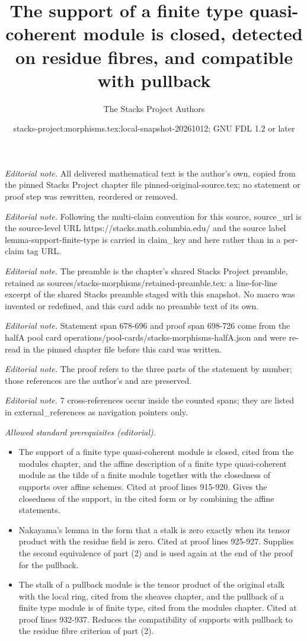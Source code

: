 \documentclass[10pt,a4paper]{amsart}
\title{The support of a finite type quasi-coherent module is closed, detected on residue fibres, and compatible with pullback}
\author{The Stacks Project Authors}
\date{stacks-project:morphisms.tex:local-snapshot-20261012; GNU FDL 1.2 or later}
\theoremstyle{plain}
\theoremstyle{definition}
\theoremstyle{remark}
\numberwithin{equation}{subsection}
\begin{document}
\maketitle
\noindent\textit{Editorial note.} All delivered mathematical text is the author's own, copied from the pinned Stacks Project chapter file pinned-original-source.tex; no statement or proof step was rewritten, reordered or removed.\par\medskip
\noindent\textit{Editorial note.} Following the multi-claim convention for this source, source\_url is the source-level URL https://stacks.math.columbia.edu/ and the source label lemma-support-finite-type is carried in claim\_key and here rather than in a per-claim tag URL.\par\medskip
\noindent\textit{Editorial note.} The preamble is the chapter's shared Stacks Project preamble, retained as sources/stacks-morphisms/retained-preamble.tex: a line-for-line excerpt of the shared Stacks preamble staged with this snapshot. No macro was invented or redefined, and this card adds no preamble text of its own.\par\medskip
\noindent\textit{Editorial note.} Statement span 678-696 and proof span 698-726 come from the halfA pool card operations/pool-cards/stacks-morphisms-halfA.json and were re-read in the pinned chapter file before this card was written.\par\medskip
\noindent\textit{Editorial note.} The proof refers to the three parts of the statement by number; those references are the author's and are preserved.\par\medskip
\noindent\textit{Editorial note.} 7 cross-references occur inside the counted spans; they are listed in external\_references as navigation pointers only.\par\medskip
\noindent\textit{Allowed standard prerequisites (editorial).}\begin{itemize}
\item The support of a finite type quasi-coherent module is closed, cited from the modules chapter, and the affine description of a finite type quasi-coherent module as the tilde of a finite module together with the closedness of supports over affine schemes. Cited at proof lines 915-920. Gives the closedness of the support, in the cited form or by combining the affine statements.
\item Nakayama's lemma in the form that a stalk is zero exactly when its tensor product with the residue field is zero. Cited at proof lines 925-927. Supplies the second equivalence of part (2) and is used again at the end of the proof for the pullback.
\item The stalk of a pullback module is the tensor product of the original stalk with the local ring, cited from the sheaves chapter, and the pullback of a finite type module is of finite type, cited from the modules chapter. Cited at proof lines 932-937. Reduces the compatibility of supports with pullback to the residue fibre criterion of part (2).
\end{itemize}\medskip
\end{document}
